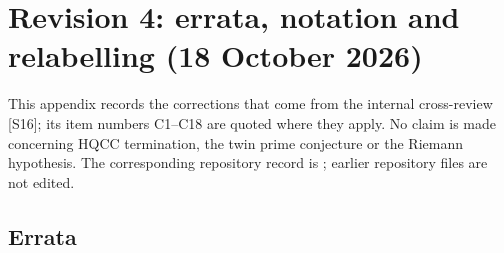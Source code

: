 \documentclass[11pt]{article}
\theoremstyle{definition}
\newcommand{\src}[1]{\textup{[S#1]}}
\begin{document}
\section{Revision 4: errata, notation and relabelling (18 October 2026)}\label{app:rev4}
This appendix records the corrections that come from the internal cross-review \src{16}; its item numbers C1--C18 are quoted where they apply. No claim is made
concerning HQCC termination, the twin prime conjecture or the Riemann hypothesis. The corresponding repository record is
; earlier repository files are not edited.

\subsection{Errata}
\end{document}

